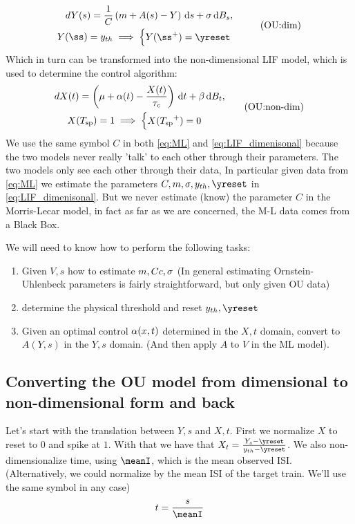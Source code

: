\documentclass{article}
\begin{document}
\begin{equation}
\begin{gathered}
dY(s) = \frac 1C \left( m + A(s) - Y  \right) \intd{s} + \s \intd{B_s},
\\
Y(\ss) = \yth \implies
\begin{cases}
Y(\ss^+) = \yreset & 
\end{cases}
\end{gathered}
\tag{OU:dim}
\label{eq:LIF_dimenisonal}
\end{equation}
Which in turn can be transformed into the non-dimensional LIF model, which is
used to determine the control algorithm:
\begin{equation}
\begin{gathered}
dX(t) = \left({\mu } + {\alpha}(t) - \frac{X(t)}{{ \tau_{c} }} \right) \, \mathrm{d} t + {\beta} \, \mathrm{d} B_t,
\\
X({ T_{\textrm{sp} } }) = 1 \implies
\begin{cases}
X({ T_{\textrm{sp} } }^+) = 0 & 
\end{cases}
\end{gathered}
\tag{OU:non-dim}
\label{eq:LIF_non_dimenisonal}
\end{equation}
We use the same symbol $C$ in both \cref{eq:ML} and \cref{eq:LIF_dimenisonal}
because the two models never really 'talk' to each other through their parameters. The
two models only see each other through their data, 
In particular given data from \cref{eq:ML} we estimate the
parameters $C, m,\s, \yth, \yreset$ in \cref{eq:LIF_dimenisonal}. But we never
estimate (know) the parameter $C$ in the Morris-Lecar model, in fact as far as
we are concerned, the M-L data comes from a Black Box. 

We will need to know how to perform the following tasks:
\begin{enumerate}
  \item Given $V,s$ how to estimate $m, Cc, {\sigma }$ (In general estimating
  Ornstein-Uhlenbeck parameters is fairly straightforward, but only given OU
  data)
  
  \item determine the physical threshold and reset $\yth, \yreset$
  
  \item Given an optimal control ${\alpha}(x,t)$ determined in the $X,t$ domain,
  convert to $A(Y, s)$ in the $Y,s$ domain. (And then apply $A$ to $V$ in the
  ML model).
\end{enumerate}

\subsection{Converting the OU model from dimensional to non-dimensional form
and back}
Let's start with the translation between $Y,s$ and $X,t$. First we
normalize $X$ to reset to 0 and spike at $1$. With that we have that $X_t =
\frac{Y_s - \yreset}{\yth - \yreset} $. We also non-dimensionalize time, using $\meanI$,
which is the mean observed ISI. (Alternatively, we could normalize by the mean
ISI of the target train. We'll use the same symbol in any case) $$ t = \frac
s\meanI$$
\end{document}

